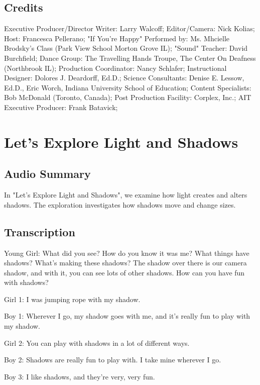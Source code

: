 \subsection{Credits}

Executive Producer/Director Writer: Larry Walcoff;
Editor/Camera: Nick Kolias;
Host: Francesca Pellerano;
"If You're Happy" Performed by: Ms. Mhcielle Brodsky's Class (Park View School Morton Grove IL);
"Sound" Teacher: David Burchfield;
Dance Group: The Travelling Hands Troupe, The Center On Deafness (Northbrook IL);
Production Coordinator: Nancy Schlafer;
Instructional Designer: Dolores J. Deardorff, Ed.D.;
Science Consultants: Denise E. Lessow, Ed.D., Eric Worch, Indiana University School of Education;
Content Specialists: Bob McDonald (Toronto, Canada);
Post Production Facility: Corplex, Inc.;
AIT Executive Producer: Frank Batavick;

\section{Let's Explore Light and Shadows}

\subsection{Audio Summary}

In "Let's Explore Light and Shadows", we examine how light creates and alters shadows. The exploration investigates how shadows move and change sizes.

\subsection{Transcription}

Young Girl: What did you see? How do you know it was me? What things have shadows? What's making these shadows? The shadow over there is our camera shadow, and with it, you can see lots of other shadows. How can you have fun with shadows?

Girl 1: I was jumping rope with my shadow.

Boy 1: Wherever I go, my shadow goes with me, and it's really fun to play with my shadow.

Girl 2: You can play with shadows in a lot of different ways.

Boy 2: Shadows are really fun to play with. I take mine wherever I go.

Boy 3: I like shadows, and they're very, very fun.

